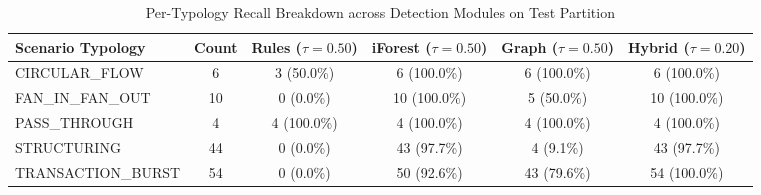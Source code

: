 \begin{table}[htbp]
\centering
\caption{Per-Typology Recall Breakdown across Detection Modules on Test Partition}
\label{tab:typology_breakdown}
\begin{tabular}{lccccc}
\toprule
\textbf{Scenario Typology} & \textbf{Count} & \textbf{Rules ($\tau=0.50$)} & \textbf{iForest ($\tau=0.50$)} & \textbf{Graph ($\tau=0.50$)} & \textbf{Hybrid ($\tau=0.20$)} \\
\midrule
CIRCULAR_FLOW & 6 & 3 (50.0\%) & 6 (100.0\%) & 6 (100.0\%) & 6 (100.0\%) \\
FAN_IN_FAN_OUT & 10 & 0 (0.0\%) & 10 (100.0\%) & 5 (50.0\%) & 10 (100.0\%) \\
PASS_THROUGH & 4 & 4 (100.0\%) & 4 (100.0\%) & 4 (100.0\%) & 4 (100.0\%) \\
STRUCTURING & 44 & 0 (0.0\%) & 43 (97.7\%) & 4 (9.1\%) & 43 (97.7\%) \\
TRANSACTION_BURST & 54 & 0 (0.0\%) & 50 (92.6\%) & 43 (79.6\%) & 54 (100.0\%) \\
\bottomrule
\end{tabular}
\end{table}
